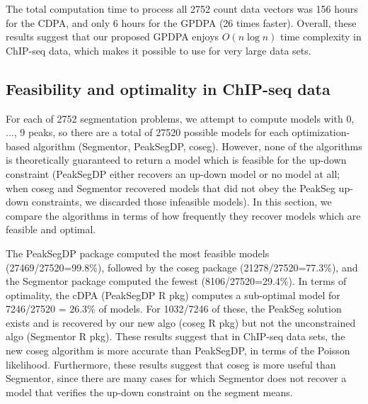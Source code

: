 \documentclass[aoas]{imsart}
\begin{document}
The total computation time to process all 2752 count data vectors was
156 hours for the CDPA, and only 6 hours for the GPDPA (26 times
faster). Overall, these results suggest that our proposed GPDPA enjoys
$O(n\log n)$ time complexity in ChIP-seq data, which makes it possible
to use for very large data sets.



\subsection{Feasibility and optimality in ChIP-seq data}

For each of 2752 segmentation problems, we attempt to compute models
with 0, ..., 9 peaks, so there are a total of 27520 possible models
for each optimization-based algorithm (Segmentor, PeakSegDP,
coseg). However, none of the algorithms is theoretically guaranteed to
return a model which is feasible for the up-down constraint (PeakSegDP
either recovers an up-down model or no model at all; when coseg and
Segmentor recovered models that did not obey the PeakSeg up-down
constraints, we discarded those infeasible models). In this section,
we compare the algorithms in terms of how frequently they recover
models which are feasible and optimal.

The PeakSegDP package computed the most feasible models
(27469/27520=99.8\%), followed by the coseg package
(21278/27520=77.3\%), and the Segmentor package computed the fewest
(8106/27520=29.4\%). In terms of optimality, the cDPA (PeakSegDP R
pkg) computes a sub-optimal model for 7246/27520 = 26.3\% of
models. For 1032/7246 of these, the PeakSeg solution exists and is
recovered by our new algo (coseg R pkg) but not the unconstrained algo
(Segmentor R pkg). These results suggest that in ChIP-seq data sets,
the new coseg algorithm is more accurate than PeakSegDP, in terms of
the Poisson likelihood. Furthermore, these results suggest that coseg
is more useful than Segmentor, since there are many cases for which
Segmentor does not recover a model that verifies the up-down
constraint on the segment means.

\end{document}
